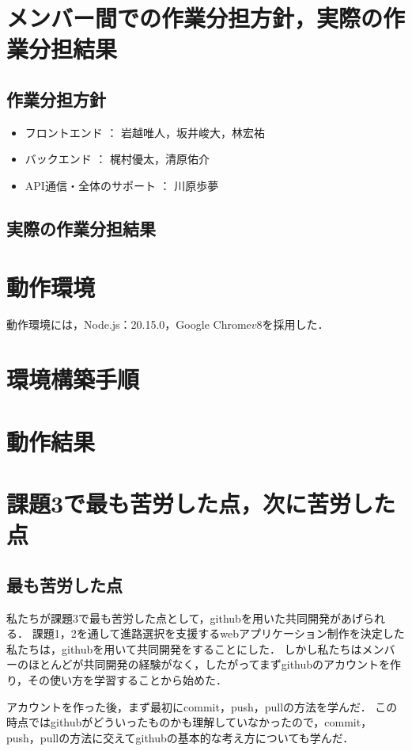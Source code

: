 \documentclass[a4j，titlepage]{jarticle}
\begin{document}
\section{メンバー間での作業分担方針，実際の作業分担結果}

\subsection{作業分担方針}
\begin{itemize}
\item フロントエンド ： 岩越唯人，坂井峻大，林宏祐
\item バックエンド ： 梶村優太，清原佑介
\item API通信・全体のサポート ： 川原歩夢
\end{itemize}

\subsection{実際の作業分担結果}


\section{動作環境}
動作環境には，Node.js：20.15.0，Google Chrome\(v8\)を採用した．
\section{環境構築手順}

\section{動作結果}

\section{課題3で最も苦労した点，次に苦労した点}
\subsection{最も苦労した点}

私たちが課題3で最も苦労した点として，githubを用いた共同開発があげられる．
課題1，2を通して進路選択を支援するwebアプリケーション制作を決定した私たちは，githubを用いて共同開発をすることにした．
しかし私たちはメンバーのほとんどが共同開発の経験がなく，したがってまずgithubのアカウントを作り，その使い方を学習することから始めた．

アカウントを作った後，まず最初にcommit，push，pullの方法を学んだ．
この時点ではgithubがどういったものかも理解していなかったので，commit，push，pullの方法に交えてgithubの基本的な考え方についても学んだ．
\end{document}
